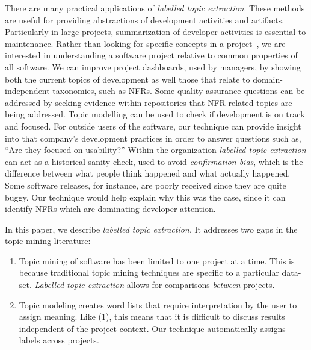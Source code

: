 \documentclass[]{sig-alternate}
\begin{document}
There are many practical applications of \emph{labelled topic extraction}.
These methods are useful for providing abstractions of development activities and artifacts.
Particularly in large projects, summarization of developer activities is essential to maintenance. 
Rather than looking for specific concepts in a project~\cite{marcus04wcre}, we are interested in understanding a software project relative to common properties of all software.
We can improve project dashboards, used by managers, by showing both the current topics of development as well those that relate to domain-independent taxonomies, such as NFRs.
Some quality assurance questions can be addressed by seeking evidence within repositories that NFR-related topics are being addressed.
Topic modelling can be used to check if development is on track and focused.
For outside users of the software, our technique can provide insight into that company's development practices in order to answer questions such as, ``Are they focused on usability?''
Within the organization \emph{labelled topic extraction} can act as a historical sanity check, used to avoid \emph{confirmation bias}, which is the difference between what people think happened and what actually happened. 
Some software releases, for instance, are poorly received since they are quite buggy. 
Our technique would help explain why this was the case, since it can identify NFRs which are dominating developer attention.


In this paper, we describe \emph{labelled topic extraction}. It addresses two gaps in the topic mining literature:
\begin{enumerate}
  \item Topic mining of software has been limited to one project at a time. 
This is because traditional topic mining techniques are specific to a particular data-set. 
\textit{Labelled topic extraction} allows for comparisons \textit{between} projects. 
  \item Topic modeling creates word lists that require interpretation by the user to assign meaning. 
Like (1), this means
that it is difficult to discuss results independent of the project context. 
Our technique automatically assigns labels across projects.
\end{enumerate}
\end{document}
